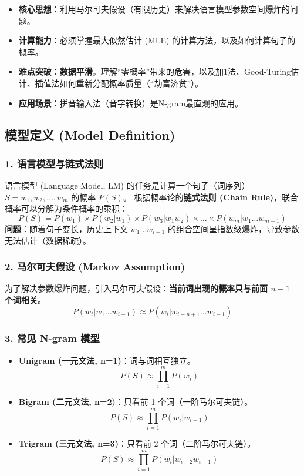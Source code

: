 \documentclass[a4paper, 11pt]{ctexart}
\begin{document}
\begin{note}[本章核心考点]
\begin{itemize}
    \item \textbf{核心思想}：利用马尔可夫假设（有限历史）来解决语言模型参数空间爆炸的问题。
    \item \textbf{计算能力}：必须掌握最大似然估计 (MLE) 的计算方法，以及如何计算句子的概率。
    \item \textbf{难点突破}：\textbf{数据平滑}。理解“零概率”带来的危害，以及加1法、Good-Turing估计、插值法如何重新分配概率质量（“劫富济贫”）。
    \item \textbf{应用场景}：拼音输入法（音字转换）是N-gram最直观的应用。
\end{itemize}
\end{note}

\subsection{模型定义 (Model Definition)}

\subsubsection{1. 语言模型与链式法则}
语言模型 (Language Model, LM) 的任务是计算一个句子（词序列）$S = w_1, w_2, \dots, w_m$ 的概率 $P(S)$。
根据概率论的\textbf{链式法则 (Chain Rule)}，联合概率可以分解为条件概率的乘积：
\begin{equation}
    P(S) = P(w_1) \times P(w_2|w_1) \times P(w_3|w_1 w_2) \times \dots \times P(w_m|w_1 \dots w_{m-1})
\end{equation}
\textbf{问题}：随着句子变长，历史上下文 $w_1 \dots w_{i-1}$ 的组合空间呈指数级爆炸，导致参数无法估计（数据稀疏）。

\subsubsection{2. 马尔可夫假设 (Markov Assumption)}
为了解决参数爆炸问题，引入马尔可夫假设：\textbf{当前词出现的概率只与前面 $n-1$ 个词相关}。
\begin{equation}
    P(w_i | w_1 \dots w_{i-1}) \approx P(w_i | w_{i-n+1} \dots w_{i-1})
\end{equation}

\subsubsection{3. 常见 N-gram 模型}
\begin{itemize}
    \item \textbf{Unigram (一元文法, n=1)}：词与词相互独立。
    $$ P(S) \approx \prod_{i=1}^m P(w_i) $$
    \item \textbf{Bigram (二元文法, n=2)}：只看前 1 个词（一阶马尔可夫链）。
    $$ P(S) \approx \prod_{i=1}^m P(w_i | w_{i-1}) $$
    \item \textbf{Trigram (三元文法, n=3)}：只看前 2 个词（二阶马尔可夫链）。
    $$ P(S) \approx \prod_{i=1}^m P(w_i | w_{i-2} w_{i-1}) $$
\end{itemize}
\end{document}
